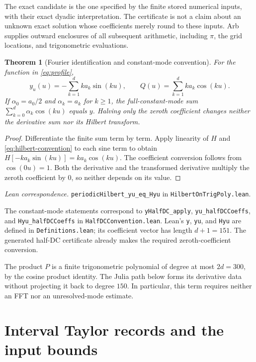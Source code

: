 \documentclass[11pt]{article}
\newtheorem{theorem}{Theorem}[section]
\theoremstyle{definition}
\theoremstyle{remark}
\newcommand{\code}[1]{\nolinkurl{#1}}
\newcommand{\leanref}[2]{\par\smallskip\noindent\textit{Lean correspondence.}
  \code{#1} in \code{#2}.\par\smallskip}
\numberwithin{equation}{section}
\begin{document}
The exact candidate is the one specified by the finite stored numerical
inputs, with their exact dyadic interpretation. The certificate is not a
claim about an unknown exact solution whose coefficients merely round to
these inputs. Arb supplies outward enclosures of all subsequent arithmetic,
including $\pi$, the grid locations, and trigonometric evaluations.

\begin{theorem}[Fourier identification and constant-mode convention]
\label{thm:fourier}
For the function in \eqref{eq:profile},
\begin{equation}
 y_u(u)=-\sum_{k=1}^{d}ka_k\sin(ku),\qquad
 Q(u)=\sum_{k=1}^{d}ka_k\cos(ku).
 \label{eq:fourier-Q}
\end{equation}
If $\alpha_0=a_0/2$ and $\alpha_k=a_k$ for $k\geq1$, the full-constant-mode
sum $\sum_{k=0}^{d}\alpha_k\cos(ku)$ equals $y$. Halving only the zeroth
coefficient changes neither the derivative sum nor its Hilbert transform.
\end{theorem}
\begin{proof}
Differentiate the finite sum term by term. Apply linearity of $H$ and
\eqref{eq:hilbert-convention} to each sine term to obtain
$H[-ka_k\sin(ku)]=ka_k\cos(ku)$. The coefficient conversion follows from
$\cos(0u)=1$. Both the derivative and the transformed derivative multiply
the zeroth coefficient by $0$, so neither depends on its value.
\end{proof}
\leanref{periodicHilbert_yu_eq_Hyu}{HilbertOnTrigPoly.lean}
The constant-mode statements correspond to \code{yHalfDC_apply},
\code{yu_halfDCCoeffs}, and \code{Hyu_halfDCCoeffs} in
\code{HalfDCConvention.lean}. Lean's \code{y}, \code{yu}, and \code{Hyu}
are defined in \code{Definitions.lean}; its coefficient vector has length
$d+1=151$. The generated half-DC certificate already makes the required
zeroth-coefficient conversion.

The product $P$ is a finite trigonometric polynomial of degree at most
$2d=300$, by the cosine product identity. The Julia path below forms its
derivative data without projecting it back to degree $150$. In particular,
this term requires neither an FFT nor an unresolved-mode estimate.

\section{Interval Taylor records and the input bounds}
\label{sec:records}
\end{document}
